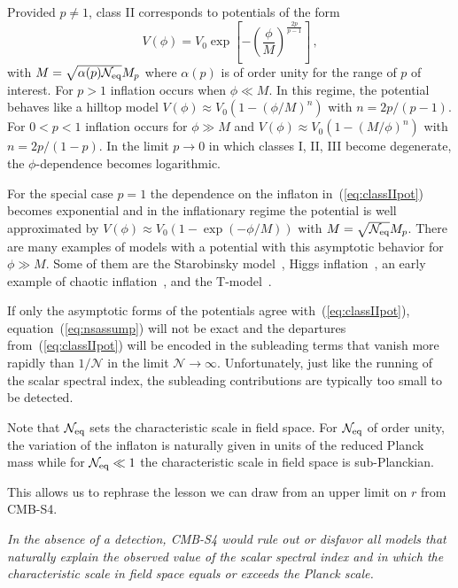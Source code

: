 Provided $p\neq 1$, class II corresponds to potentials of the form 
\begin{equation}\label{eq:classIIpot}
V(\phi)=V_0\exp\left[-\left(\frac{\phi}{M}\right)^{\frac{2p}{p-1}}\right]\,,
\end{equation}
with $M=\sqrt{\alpha(p)\mathcal{N}_{\rm eq}}M_p$ where $\alpha(p)$ is of order unity for the range of $p$ of interest. For $p>1$ inflation occurs when $\phi\ll M$. In this regime, the potential behaves like a hilltop model $V(\phi)\approx V_0(1-\left(\phi/M\right)^n)$ with $n=2p/(p-1)$. For $0<p<1$ inflation occurs for $\phi\gg M$ and $V(\phi)\approx V_0(1-\left(M/\phi\right)^n)$ with $n=2p/(1-p)$. In the limit $p\to0$ in which classes I, II, III become degenerate, the $\phi$-dependence becomes logarithmic. 

For the special case $p=1$ the dependence on the inflaton in~(\ref{eq:classIIpot}) becomes exponential and in the inflationary regime the potential is well approximated by $V(\phi)\approx V_0\left(1-\exp\left(-\phi/M\right)\right)$ with $M=\sqrt{\mathcal{N}_{\rm eq}}M_p$. There are many examples of models with a potential with this asymptotic behavior for $\phi\gg M$. Some of them are the Starobinsky model~\cite{Starobinsky:1980te}, Higgs inflation~\cite{Salopek:1988qh,Bezrukov:2007ep}, an early example of chaotic inflation~\cite{Goncharov:1983mw}, and the T-model~\cite{Kallosh:2013hoa}.

If only the asymptotic forms of the potentials agree with~(\ref{eq:classIIpot}), equation~(\ref{eq:nsassump}) will not be exact and the departures from~(\ref{eq:classIIpot}) will be encoded in the subleading terms that vanish more rapidly than $1/\mathcal{N}$ in the limit $\mathcal{N}\to\infty$. Unfortunately, just like the running of the scalar spectral index, the subleading contributions are typically too small to be detected.

Note that $\mathcal{N}_{\rm eq}$ sets the characteristic scale in field space. For $\mathcal{N}_{\rm eq}$ of order unity, the variation of the inflaton is naturally given in units of the reduced Planck mass while for $\mathcal{N}_{\rm eq}\ll 1$ the characteristic scale in field space is sub-Planckian. 

This allows us to rephrase the lesson we can draw from an upper limit on $r$ from CMB-S4.

{\em In the absence of a detection, CMB-S4 would rule out or disfavor all models that naturally explain the observed value of the scalar spectral index and in which the characteristic scale in field space equals or exceeds the Planck scale.}

